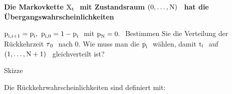 {
\begin{uebsp}
\newcommand\textstyleAbsatzStandardschriftart[1]{#1}
\newcommand\normalsubformula[1]{\text{\mathversion{normal}$#1$}}



\begin{Exercise}
{\bfseries
Die Markovkette 
$\normalsubformula{\text{X}}_{\normalsubformula{\text{t}}}\normalsubformula{\text{~}}$
\textstyleAbsatzStandardschriftart{mit Zustandsraum }
$\left(\normalsubformula{\text{0}},\ldots
,\normalsubformula{\text{N}}\right)\normalsubformula{\text{~}}$
\textstyleAbsatzStandardschriftart{hat die
\"Ubergangswahrscheinlichkeiten }\newline
{}

$\normalsubformula{\text{p}}_{\normalsubformula{\text{i}},\normalsubformula{\text{i}}+\normalsubformula{\text{1}}}=\normalsubformula{\text{p}}_{\normalsubformula{\text{i}}},\normalsubformula{\text{~}}\normalsubformula{\text{p}}_{\normalsubformula{\text{i}},\normalsubformula{\text{0}}}=\normalsubformula{\text{1}}-\normalsubformula{\text{p}}_{\normalsubformula{\text{i}}}\normalsubformula{\text{~}}$
\textstyleAbsatzStandardschriftart{mit }
$\normalsubformula{\text{p}}_{\normalsubformula{\text{N}}}=\normalsubformula{\text{0}}\text{.}\normalsubformula{\text{~}}$
\textstyleAbsatzStandardschriftart{Bestimmen Sie die Verteilung der
R\"uckkehrzeit } $\normalsubformula{\text{$\tau
$}}_{\normalsubformula{\text{0}}}\normalsubformula{\text{~}}$
\textstyleAbsatzStandardschriftart{nach 0. Wie muss man die }
$\normalsubformula{\text{p}}_{\normalsubformula{\text{i}}}\normalsubformula{\text{~}}$
\textstyleAbsatzStandardschriftart{w\"ahlen, damit }
$\normalsubformula{\text{t}}_{\normalsubformula{\text{i}}}\normalsubformula{\text{~}}$
\textstyleAbsatzStandardschriftart{auf }
$\left(\normalsubformula{\text{1}},\ldots
,\normalsubformula{\text{N}}+\normalsubformula{\text{1}}\right)\normalsubformula{\text{~}}$
\textstyleAbsatzStandardschriftart{gleichverteilt ist?}}
\end{Exercise}

\begin{Answer}
{
Skizze}

{
Die R\"uckkehrwahrscheinlichkeiten sind definiert mit:}


\end{Answer}
\end{uebsp}}

